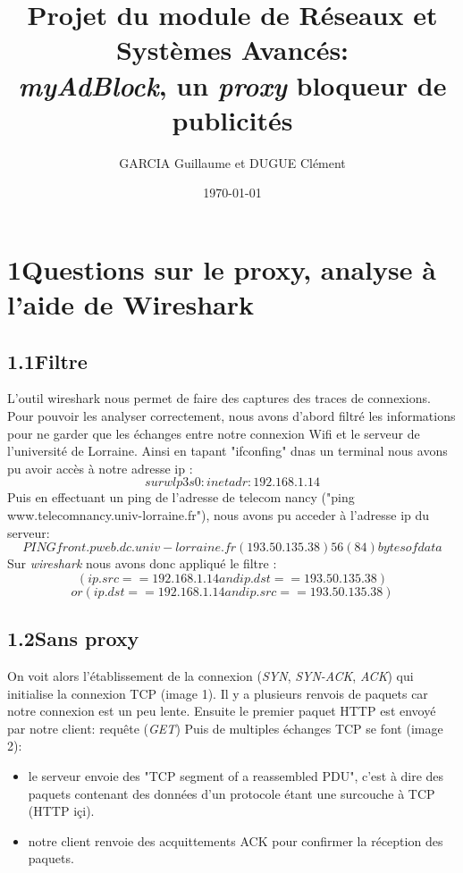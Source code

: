 \documentclass[12pt, a4paper]{report}
\title{Projet du module de Réseaux et Systèmes  Avancés:\\ \textit{myAdBlock}, un \textit{proxy} bloqueur de publicités}
\author{GARCIA  Guillaume et DUGUE Clément}
\date{\today}
\begin{document}
\maketitle

\hypersetup{linkcolor=blue}

\chapter*{1\hspace{1cm}Questions sur le proxy, analyse à l'aide de Wireshark}

\section*{\hspace{0.6cm}1.1\hspace{0.6cm}Filtre}
\hspace{1cm}L'outil wireshark nous permet de faire des captures des traces de connexions. Pour pouvoir les analyser correctement, nous avons d'abord filtré les informations pour ne garder que les échanges entre notre connexion Wifi et le serveur de l'université de Lorraine. Ainsi en tapant "ifconfing" dnas un terminal nous avons pu avoir accès à notre adresse ip : \[sur wlp3s0 : inet adr:192.168.1.14\]
\hspace{1cm}Puis en effectuant un ping de l'adresse de telecom nancy ("ping www.telecomnancy.univ-lorraine.fr"), nous avons pu acceder à l'adresse ip du serveur: \[PING front.pweb.dc.univ-lorraine.fr (193.50.135.38) 56(84) bytes of data\]
\hspace{1cm}Sur \textit{wireshark} nous avons donc appliqué le filtre :
\[(ip.src == 192.168.1.14 and ip.dst==193.50.135.38)\] \[ or (ip.dst==192.168.1.14 and ip.src==193.50.135.38)\]


\section*{\hspace{0.6cm}1.2\hspace{0.6cm}Sans proxy}
\hspace{1cm}On voit alors l'établissement de la connexion (\textit{SYN}, \textit{SYN-ACK}, \textit{ACK}) qui initialise la connexion TCP (image 1). Il y a plusieurs renvois de paquets car notre connexion est un peu lente. Ensuite le premier paquet HTTP est envoyé par notre client: requête (\textit{GET})
Puis de multiples échanges TCP se font (image 2):
\begin{itemize}
\item \hspace{0.2cm}le serveur envoie des "TCP segment of a reassembled PDU", c'est à dire des paquets contenant des données d'un protocole étant une surcouche à TCP (HTTP içi).
\item \hspace{0.2cm}notre client renvoie des acquittements ACK pour confirmer la réception des paquets.
\end{itemize}
\end{document}
